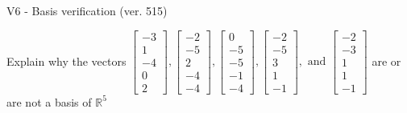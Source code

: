 \begin{exercise}
  \begin{exerciseTitle}V6 - Basis verification (ver. 515)\end{exerciseTitle}
  \begin{exerciseStatement}
    Explain why the vectors \(\left[\begin{array}{r}
-3 \\
1 \\
-4 \\
0 \\
2
\end{array}\right] , \left[\begin{array}{r}
-2 \\
-5 \\
2 \\
-4 \\
-4
\end{array}\right] , \left[\begin{array}{r}
0 \\
-5 \\
-5 \\
-1 \\
-4
\end{array}\right] , \left[\begin{array}{r}
-2 \\
-5 \\
3 \\
1 \\
-1
\end{array}\right] , \text{ and } \left[\begin{array}{r}
-2 \\
-3 \\
1 \\
1 \\
-1
\end{array}\right]\) are or are not a basis of \(\mathbb{R}^5\)	



\end{exerciseStatement}
\end{exercise}
